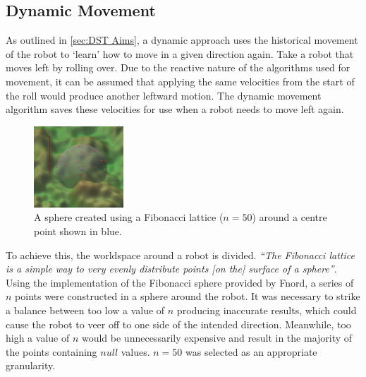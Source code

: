 \documentclass{article}
\begin{document}
\subsection{Dynamic Movement}
\label{sec:DST Imp}
As outlined in \ref{sec:DST Aims}, a dynamic approach uses the historical movement of the robot to ‘learn’ how to move in a given direction again. 
Take a robot that moves left by rolling over. Due to the reactive nature of the algorithms used for movement, it can be assumed that applying the same velocities from the start of the roll would produce another leftward motion. The dynamic movement algorithm saves these velocities for use when a robot needs to move left again. \\
\begin{figure}
    \centering
    \vspace*{-5mm}
    \includegraphics[width=0.3\textwidth]{spherePoints}
    \vspace*{-7mm}
    \caption{A sphere created using a Fibonacci lattice ($n=50$) around a centre point shown in blue.}
\end{figure}
To achieve this, the worldspace around a robot is divided. \textit{“The Fibonacci lattice is a simple way to very evenly distribute points [on the] surface of a sphere”}.  Using the implementation of the Fibonacci sphere provided by Fnord,  a series of $n$ points were constructed in a sphere around the robot. It was necessary to strike a balance between too low a value of $n$ producing inaccurate results, which could cause the robot to veer off to one side of the intended direction. Meanwhile, too high a value of $n$ would be unnecessarily expensive and result in the majority of the points containing $null$ values. $n=50$ was selected as an appropriate granularity.\\
\end{document}
